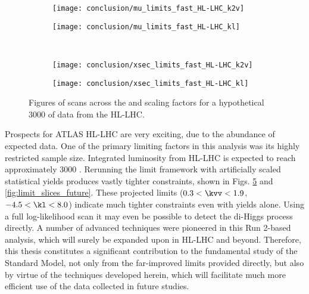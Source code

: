 \begin{figure}
    \centering
    \begin{subfigure}{0.48\textwidth} 
        \texttt{[image: conclusion/mu\_limits\_fast\_HL-LHC\_k2v]}
        \caption{}%
        \label{fig:mulimits_kvv_future}
    \end{subfigure}
    \begin{subfigure}{0.48\textwidth}
        \texttt{[image: conclusion/mu\_limits\_fast\_HL-LHC\_kl]}
        \caption{}%
        \label{fig:mulimits_kl_future}
    \end{subfigure}\\
    \begin{subfigure}{0.48\textwidth} 
        \texttt{[image: conclusion/xsec\_limits\_fast\_HL-LHC\_k2v]}
        \caption{}%
        \label{fig:xseclimits_kvv_future}
    \end{subfigure}
    \begin{subfigure}{0.48\textwidth}
        \texttt{[image: conclusion/xsec\_limits\_fast\_HL-LHC\_kl]}
        \caption{}%
        \label{fig:xseclimits_kl_future}
    \end{subfigure}
    \caption{
        Figures of scans across the \kvv and \kl scaling factors
            for a hypothetical 3000 \ifb of data from the HL-LHC.
    }
    \label{fig:mu_xsec_future}
\end{figure}

Prospects for ATLAS HL-LHC are very exciting, due to the abundance of expected data.
One of the primary limiting factors in this analysis was its highly restricted sample size.
Integrated luminosity from HL-LHC is expected to reach approximately 3000 \ifb.
Rerunning the limit framework with artificially scaled statistical yields produces vastly tighter constraints,
    shown in Figs. \ref{fig:mu_xsec_future} and \ref{fig:limit_slices_future}.
These projected limits 
    ($0.3<\kvv<1.9$, $-4.5<\kl<8.0$)
    indicate much tighter constraints even with yields alone.
Using a full log-likelihood scan it may even be possible to detect the di-Higgs process directly.
A number of advanced techniques were pioneered in this Run 2-based analysis,
    which will surely be expanded upon in HL-LHC and beyond.
Therefore, this thesis constitutes a significant contribution to the fundamental study of the Standard Model,
    not only from the far-improved limits provided directly,
    but also by virtue of the techniques developed herein,
    which will facilitate much more efficient use of the data collected in future studies.


